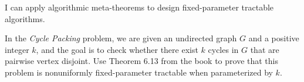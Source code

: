 \documentclass{uebung_cs}
\begin{document}


\begin{skill}
  I can apply algorithmic meta-theorems to design fixed-parameter tractable algorithms.
\end{skill}

\begin{exercise}
In the \emph{Cycle Packing} problem, we are given an undirected graph $G$ and a positive integer $k$, and the goal is to check whether there exist $k$ cycles in $G$ that are pairwise vertex disjoint. Use Theorem 6.13 from the book to prove that this problem is nonuniformly fixed-parameter tractable when parameterized by $k$.
\end{exercise}

  
\end{document}
